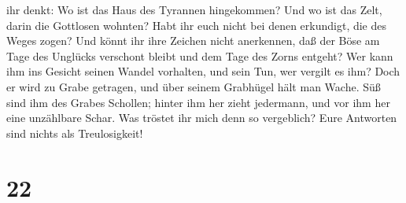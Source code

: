 ihr denkt: Wo ist das Haus des Tyrannen hingekommen? Und wo ist das
Zelt, darin die Gottlosen wohnten?  Habt ihr euch nicht
bei denen erkundigt, die des Weges zogen? Und könnt ihr ihre Zeichen
nicht anerkennen,  daß der Böse am Tage des Unglücks
verschont bleibt und dem Tage des Zorns entgeht?  Wer
kann ihm ins Gesicht seinen Wandel vorhalten, und sein Tun, wer vergilt
es ihm?  Doch er wird zu Grabe getragen, und über seinem
Grabhügel hält man Wache.  Süß sind ihm des Grabes
Schollen; hinter ihm her zieht jedermann, und vor ihm her eine
unzählbare Schar.  Was tröstet ihr mich denn so
vergeblich? Eure Antworten sind nichts als Treulosigkeit!

\hypertarget{section-21}{%
\section{22}\label{section-21}}

